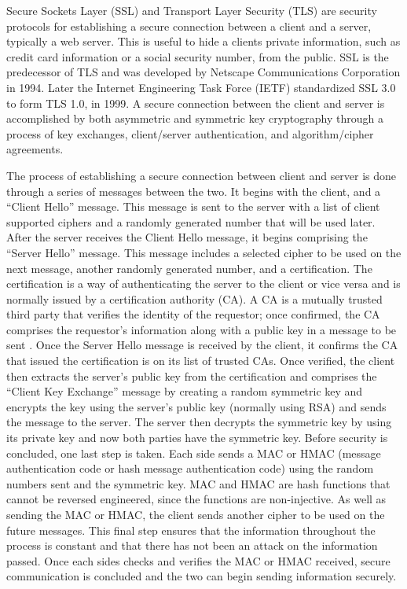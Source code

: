 Secure Sockets Layer (SSL) and Transport Layer Security (TLS) are security
protocols for establishing a secure connection between a client and a server,
typically a web server.  This is useful to hide a clients private information,
such as credit card information or a social security number, from the public.
SSL is the predecessor of TLS and was developed by Netscape Communications
Corporation in 1994.  Later the Internet Engineering Task Force (IETF)
standardized SSL 3.0 to form TLS 1.0, in 1999.  A secure connection between the
client and server is accomplished by both asymmetric and symmetric key
cryptography through a process of key exchanges, client/server authentication,
and algorithm/cipher agreements.

The process of establishing a secure connection between client and server is
done through a series of messages between the two.  It begins with the client,
and a ``Client Hello'' message.  This message is sent to the server with a list
of client supported ciphers and a randomly generated number that will be used
later.  After the server receives the Client Hello message, it begins
comprising the ``Server Hello'' message.  This message includes a selected cipher
to be used on the next message, another randomly generated number, and a
certification.  The certification is a way of authenticating the server to the
client or vice versa and is normally issued by a certification authority (CA).
A CA is a mutually trusted third party that verifies the identity of the
requestor; once confirmed, the CA comprises the requestor's information along
with a public key in a message to be sent \cite[p. 105]{oppliger}.  Once the Server
Hello message is received by the client, it confirms the CA that issued the
certification is on its list of trusted CAs.  Once verified, the client then
extracts the server's public key from the certification and comprises the
``Client Key Exchange'' message by creating a random symmetric key and encrypts
the key using the server's public key (normally using RSA) and sends the
message to the server.  The server then decrypts the symmetric key by using its
private key and now both parties have the symmetric key.  Before security is
concluded, one last step is taken.  Each side sends a MAC or HMAC (message
authentication code or hash message authentication code) using the random
numbers sent and the symmetric key.  MAC and HMAC are hash functions that
cannot be reversed engineered, since the functions are non-injective.  As well
as sending the MAC or HMAC, the client sends another cipher to be used on the
future messages.  This final step ensures that the information throughout the
process is constant and that there has not been an attack on the information
passed.  Once each sides checks and verifies the MAC or HMAC received, secure
communication is concluded and the two can begin sending information
securely\cite[p. 58]{rescorla}.


